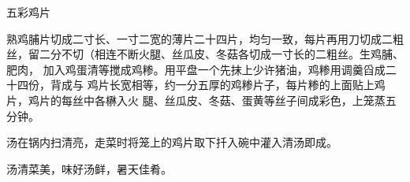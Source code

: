 \begin{recipe}{五彩鸡片}

\ingredients


\preparation

\step 熟鸡脯片切成二寸长、一寸二宽的薄片二十四片，均匀一致，每片再用刀切成二粗
丝，留二分不切（相连不断火腿、丝瓜皮、冬菇各切成一寸长的二粗丝。生鸡脯、肥肉，
加入鸡蛋清等搅成鸡糁。用平盘一个先抹上少许猪油，鸡糁用调羹舀成二十四份，背成与
鸡片长宽相等，约一分五厚的鸡糁片子，每片糁的上面贴上鸡片，鸡片的每丝中各楙入火
腿、丝瓜皮、冬菇、蛋黄等丝子间成彩色，上笼蒸五分钟。

汤在锅内扫清亮，走菜时将笼上的鸡片取下扦入碗中灌入清汤即成。

\features

汤清菜美，味好汤鲜，暑天佳肴。

\end{recipe}

